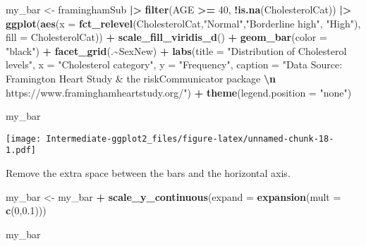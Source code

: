 \documentclass[
]{article}
\newenvironment{Shaded}{\begin{snugshade}}{\end{snugshade}}
\newcommand{\AttributeTok}[1]{\textcolor[rgb]{0.13,0.29,0.53}{#1}}
\newcommand{\DecValTok}[1]{\textcolor[rgb]{0.00,0.00,0.81}{#1}}
\newcommand{\FloatTok}[1]{\textcolor[rgb]{0.00,0.00,0.81}{#1}}
\newcommand{\FunctionTok}[1]{\textcolor[rgb]{0.13,0.29,0.53}{\textbf{#1}}}
\newcommand{\NormalTok}[1]{#1}
\newcommand{\OtherTok}[1]{\textcolor[rgb]{0.56,0.35,0.01}{#1}}
\newcommand{\SpecialCharTok}[1]{\textcolor[rgb]{0.81,0.36,0.00}{\textbf{#1}}}
\newcommand{\StringTok}[1]{\textcolor[rgb]{0.31,0.60,0.02}{#1}}
\begin{document}
\begin{Shaded}
\begin{Highlighting}[]
\NormalTok{my\_bar }\OtherTok{\textless{}{-}}\NormalTok{ framinghamSub }\SpecialCharTok{|\textgreater{}} 
  \FunctionTok{filter}\NormalTok{(AGE }\SpecialCharTok{\textgreater{}=} \DecValTok{40}\NormalTok{, }\SpecialCharTok{!}\FunctionTok{is.na}\NormalTok{(CholesterolCat)) }\SpecialCharTok{|\textgreater{}}
  \FunctionTok{ggplot}\NormalTok{(}\FunctionTok{aes}\NormalTok{(}\AttributeTok{x =} \FunctionTok{fct\_relevel}\NormalTok{(CholesterolCat,}\StringTok{"Normal"}\NormalTok{,}\StringTok{"Borderline high"}\NormalTok{, }\StringTok{"High"}\NormalTok{),}
             \AttributeTok{fill =}\NormalTok{ CholesterolCat)) }\SpecialCharTok{+}
  \FunctionTok{scale\_fill\_viridis\_d}\NormalTok{() }\SpecialCharTok{+}
  \FunctionTok{geom\_bar}\NormalTok{(}\AttributeTok{color =} \StringTok{"black"}\NormalTok{) }\SpecialCharTok{+} 
  \FunctionTok{facet\_grid}\NormalTok{(.}\SpecialCharTok{\textasciitilde{}}\NormalTok{SexNew) }\SpecialCharTok{+}
  \FunctionTok{labs}\NormalTok{(}\AttributeTok{title =} \StringTok{"Distribution of Cholesterol levels"}\NormalTok{,}
       \AttributeTok{x =} \StringTok{"Cholesterol category"}\NormalTok{,}
       \AttributeTok{y =} \StringTok{"Frequency"}\NormalTok{,}
       \AttributeTok{caption =} \StringTok{"Data Source: Framington Heart Study \& the riskCommunicator package }\SpecialCharTok{\textbackslash{}n}\StringTok{ https://www.framinghamheartstudy.org/"}\NormalTok{) }\SpecialCharTok{+}
  \FunctionTok{theme}\NormalTok{(}\AttributeTok{legend.position =} \StringTok{"none"}\NormalTok{)}

\NormalTok{my\_bar}
\end{Highlighting}
\end{Shaded}

\texttt{[image: Intermediate-ggplot2\_files/figure-latex/unnamed-chunk-18-1.pdf]}

Remove the extra space between the bars and the horizontal axis.

\begin{Shaded}
\begin{Highlighting}[]
\NormalTok{my\_bar }\OtherTok{\textless{}{-}}\NormalTok{ my\_bar }\SpecialCharTok{+}
  \FunctionTok{scale\_y\_continuous}\NormalTok{(}\AttributeTok{expand =} \FunctionTok{expansion}\NormalTok{(}\AttributeTok{mult =} \FunctionTok{c}\NormalTok{(}\DecValTok{0}\NormalTok{,}\FloatTok{0.1}\NormalTok{)))}

\NormalTok{my\_bar}
\end{Highlighting}
\end{Shaded}
\end{document}
